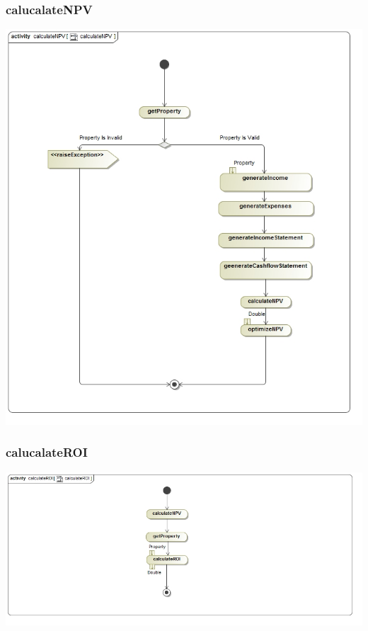 \documentclass[a4paper,12pt]{article}
\begin{document}
\subsubsection{calucalateNPV}
\includegraphics[width=1\textwidth]{./Images/newDiagrams/processSpecification/Priscilla/calculateNPV.jpg}
\subsubsection{calucalateROI}
\includegraphics[width=1\textwidth]{./Images/newDiagrams/processSpecification/Priscilla/calculateROI.jpg}
\end{document}
